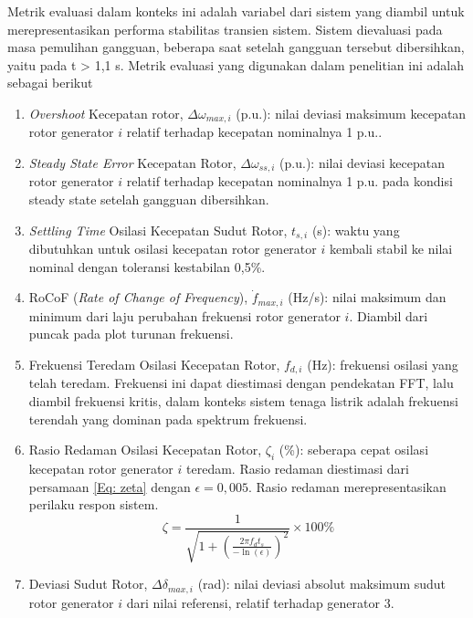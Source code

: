 Metrik evaluasi dalam konteks ini adalah variabel dari sistem yang diambil untuk merepresentasikan performa stabilitas transien sistem. Sistem dievaluasi pada masa pemulihan gangguan, beberapa saat setelah gangguan tersebut dibersihkan, yaitu pada t > 1,1 s. Metrik evaluasi yang digunakan dalam penelitian ini adalah sebagai berikut

\begin{enumerate}
	\item \textit{Overshoot} Kecepatan rotor, $\Delta \omega_{max,i}$ (p.u.): nilai deviasi maksimum kecepatan rotor generator $i$ relatif terhadap kecepatan nominalnya 1 p.u..
	\item \textit{Steady State Error} Kecepatan Rotor, $\Delta \omega_{ss,i}$ (p.u.): nilai deviasi kecepatan rotor generator $i$ relatif terhadap kecepatan nominalnya 1 p.u. pada kondisi steady state setelah gangguan dibersihkan.
	\item \textit{Settling Time} Osilasi Kecepatan Sudut Rotor, $t_{s,i}$ (s): waktu yang dibutuhkan untuk osilasi kecepatan rotor generator $i$ kembali stabil ke nilai nominal dengan toleransi kestabilan 0,5\%.
	\item RoCoF (\textit{Rate of Change of Frequency}), $\dot{f}_{max,i}$ (Hz/s): nilai maksimum dan minimum dari laju perubahan frekuensi rotor generator $i$. Diambil dari puncak pada plot turunan frekuensi.
	\item Frekuensi Teredam Osilasi Kecepatan Rotor, $f_{d,i}$ (Hz): frekuensi osilasi yang telah teredam. Frekuensi ini dapat diestimasi dengan pendekatan FFT, lalu diambil frekuensi kritis, dalam konteks sistem tenaga listrik adalah frekuensi terendah yang dominan pada spektrum frekuensi.
	\item Rasio Redaman Osilasi Kecepatan Rotor, $\zeta_i$ (\%): seberapa cepat osilasi kecepatan rotor generator $i$ teredam. Rasio redaman diestimasi dari persamaan \ref{Eq: zeta} dengan $\epsilon = 0,005$. Rasio redaman merepresentasikan perilaku respon sistem.
		\begin{equation}
			\zeta = \frac{1}{\sqrt{1 + (\frac{2\pi f_{d} t_{s}}{-\ln(\epsilon)})^2 }} \times 100\%
		\label{Eq: zeta}
		\end{equation}
	\item Deviasi Sudut Rotor, $\Delta\delta_{max,i}$ (rad): nilai deviasi absolut maksimum sudut rotor generator $i$ dari nilai referensi, relatif terhadap generator 3.
	

\end{enumerate}